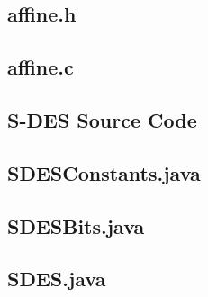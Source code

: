 \documentclass[]{article}
\begin{document}
\subsection*{affine.h}
\pagebreak{}
\subsection*{affine.c}
\pagebreak{}


\vspace*{-0.8cm}
\begin{center}
	\section*{S-DES Source Code}
\end{center}

\subsection*{SDESConstants.java}
\pagebreak{}
\subsection*{SDESBits.java}
\pagebreak{}
\subsection*{SDES.java}
\pagebreak{}


\break
\setlength{}
\printbibliography[title={References}]

\end{document}
